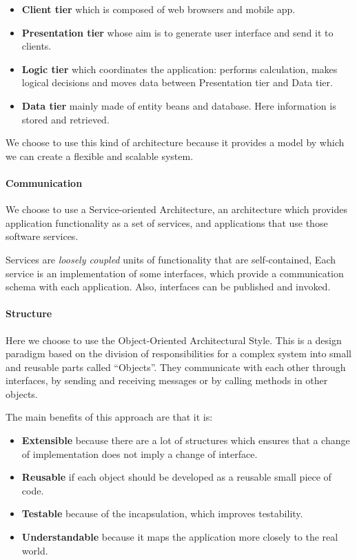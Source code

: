 \begin{itemize}
    \item{\textbf{Client tier} which is composed of web browsers and mobile app.}
    \item{\textbf{Presentation tier} whose aim is to generate user interface and send it to clients.}
    \item{\textbf{Logic tier} which coordinates the application: performs calculation, makes logical decisions and moves data between Presentation tier and Data tier.}
    \item{\textbf{Data tier} mainly made of entity beans and database. 
    Here information is stored and retrieved.}
\end{itemize}

We choose to use this kind of architecture because it provides a model by which
we can create a flexible and scalable system.

\paragraph{Communication} We choose to use a Service-oriented Architecture, 
an architecture which provides application functionality as a set of services, 
and applications that use those software services. 

Services are \textit{loosely coupled} units of functionality that are self-contained, 
Each service is an implementation of some interfaces, which provide a communication schema with
each application. Also, interfaces can be published and invoked.

\paragraph{Structure} Here we choose to use the Object-Oriented Architectural Style.
This is a design paradigm based on the division of responsibilities for a complex system
into small and reusable parts called ``Objects''.
They communicate with each other through interfaces, by sending and receiving messages
or by calling methods in other objects.

The main benefits of this approach are that it is:

\begin{itemize}
    \item{\textbf{Extensible} because there are a lot of structures which ensures that a change of implementation does not imply a change of interface.}
    \item{\textbf{Reusable} if each object should be developed as a reusable small piece of code.}
    \item{\textbf{Testable} because of the incapsulation, which improves testability.}
    \item{\textbf{Understandable} because it maps the application more closely to the real world.}
\end{itemize}

